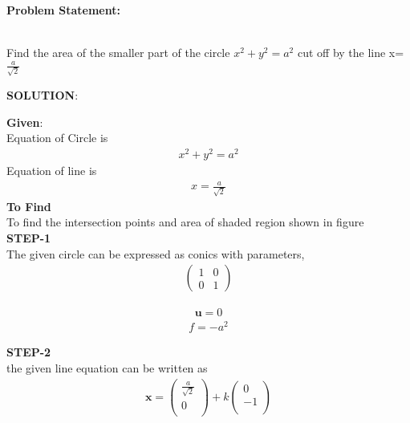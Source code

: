 \documentclass[10pt,a4paper]{report}
\newcommand{\myvec}[1]{\ensuremath{\begin{pmatrix}#1\end{pmatrix}}}
\let\vec\mathbf
\let\vec\mathbf
\begin{document}
\begin{multicols}{2}

\raggedright \textbf{Problem Statement:}\vspace{2mm}
\raggedright \\Find the area of the smaller part of the circle $x^2+y^2=a^2 $ cut off by the line x=$\frac{a}{\sqrt{2}}$\\
\vspace{5mm}
\raggedright \textbf{SOLUTION}:\vspace{2mm}\\

\raggedright \textbf{Given}:\vspace{2mm}\\
Equation of Circle is \\\vspace{1mm}
\begin{align}
x^2+y^2=a^2
\end{align}
Equation of line is \\ \vspace{1mm}
\begin{align}
x=\frac{a}{\sqrt{2}}
\end{align}
\textbf{To Find }\vspace{2mm}\\
To find the intersection points and area of shaded region shown in figure\vspace{2mm}  \\ 
\textbf{STEP-1}\vspace{2mm}\\
The given circle can be expressed as conics with parameters,\\ \vspace{1mm}
\begin{align}
\myvec{
1 & 0\\
0 & 1
}
\end{align}

\begin{align}
\vec{u}=0
\end{align} 
\begin{align}
f=-a^2
\end{align} \vspace{2mm}


\textbf{STEP-2}\vspace{2mm}\\
the given line equation can be written as\\ 
\begin{align} 
	\vec{x}=\begin{pmatrix}\frac{a}{\sqrt{2}} \\ 0 \\ \end{pmatrix}+k\begin{pmatrix} 0 \\ -1 \\ \end{pmatrix}
\end{align}


\end{multicols}
\end{document}
